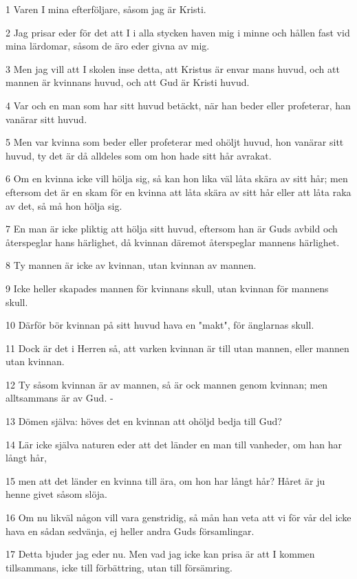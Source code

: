 \par 1 Varen I mina efterföljare, såsom jag är Kristi.
\par 2 Jag prisar eder för det att I i alla stycken haven mig i minne och hållen fast vid mina lärdomar, såsom de äro eder givna av mig.
\par 3 Men jag vill att I skolen inse detta, att Kristus är envar mans huvud, och att mannen är kvinnans huvud, och att Gud är Kristi huvud.
\par 4 Var och en man som har sitt huvud betäckt, när han beder eller profeterar, han vanärar sitt huvud.
\par 5 Men var kvinna som beder eller profeterar med ohöljt huvud, hon vanärar sitt huvud, ty det är då alldeles som om hon hade sitt hår avrakat.
\par 6 Om en kvinna icke vill hölja sig, så kan hon lika väl låta skära av sitt hår; men eftersom det är en skam för en kvinna att låta skära av sitt hår eller att låta raka av det, så må hon hölja sig.
\par 7 En man är icke pliktig att hölja sitt huvud, eftersom han är Guds avbild och återspeglar hans härlighet, då kvinnan däremot återspeglar mannens härlighet.
\par 8 Ty mannen är icke av kvinnan, utan kvinnan av mannen.
\par 9 Icke heller skapades mannen för kvinnans skull, utan kvinnan för mannens skull.
\par 10 Därför bör kvinnan på sitt huvud hava en "makt", för änglarnas skull.
\par 11 Dock är det i Herren så, att varken kvinnan är till utan mannen, eller mannen utan kvinnan.
\par 12 Ty såsom kvinnan är av mannen, så är ock mannen genom kvinnan; men alltsammans är av Gud. -
\par 13 Dömen själva: höves det en kvinnan att ohöljd bedja till Gud?
\par 14 Lär icke själva naturen eder att det länder en man till vanheder, om han har långt hår,
\par 15 men att det länder en kvinna till ära, om hon har långt hår? Håret är ju henne givet såsom slöja.
\par 16 Om nu likväl någon vill vara genstridig, så mån han veta att vi för vår del icke hava en sådan sedvänja, ej heller andra Guds församlingar.
\par 17 Detta bjuder jag eder nu. Men vad jag icke kan prisa är att I kommen tillsammans, icke till förbättring, utan till försämring.

